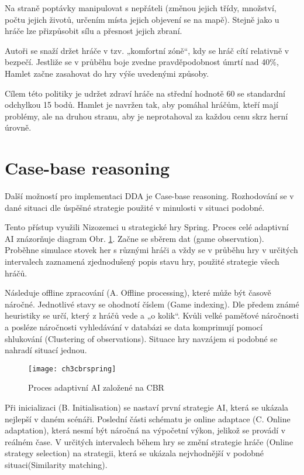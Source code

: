 Na straně poptávky manipulovat s nepřáteli (změnou jejich třídy, množství, počtu jejich životů, určením místa jejich objevení se na mapě). Stejně jako u hráče lze přizpůsobit sílu a přesnost jejich zbraní.

Autoři se snaží držet hráče v tzv. „komfortní zóně“, kdy se hráč cítí relativně v bezpečí. Jestliže se v průběhu boje zvedne pravděpodobnost úmrtí nad 40\%, Hamlet začne zasahovat do hry výše uvedenými způsoby.

Cílem této politiky je udržet zdraví hráče na střední hodnotě 60 se standardní odchylkou 15 bodů. Hamlet je navržen tak, aby pomáhal hráčům, kteří mají problémy, ale na druhou stranu, aby je neprotahoval za každou cenu skrz herní úrovně.

\section{Case-base reasoning} \label{sec:CBR}

Další možností pro implementaci DDA je Case-base reasoning. Rozhodování se v dané situaci dle úspěšné strategie použité v minulosti v situaci podobné.

Tento přístup využili Nizozemci u strategické hry Spring. \cite{21cbr} Proces celé adaptivní AI znázorňuje diagram Obr. \ref{fig:ch3cbrspring}.
Začne se sběrem dat (game observation). Proběhne simulace stovek her s různými hráči a vždy se v průběhu hry v určitých intervalech zaznamená zjednodušený popis stavu hry, použité strategie všech hráčů. 

Následuje offline zpracování (A. Offline processing), které může být časově náročné. Jednotlivé stavy se ohodnotí číslem (Game indexing). Dle předem známé heuristiky se určí, který z hráčů vede a „o kolik“. Kvůli velké paměťové náročnosti a posléze náročnosti vyhledávání v databázi se data komprimují pomocí shlukování (Clustering of observations). Situace hry navzájem si podobné se nahradí situací jednou.
 
\begin{figure}
  \centering
  \texttt{[image: ch3cbrspring]}
	\caption{Proces adaptivní AI založené na CBR \cite{21cbr}}
	\label{fig:ch3cbrspring}
\end{figure}

Při inicializaci (B. Initialisation) se nastaví první strategie AI, která se ukázala nejlepší v daném scénáři. Poslední části schématu je online adaptace (C. Online adaptation), která nesmí být náročná na výpočetní výkon, jelikož se provádí v reálném čase. V určitých intervalech během hry se změní strategie hráče (Online strategy selection) na strategii, která se ukázala nejvhodnější v podobné situaci(Similarity matching).

